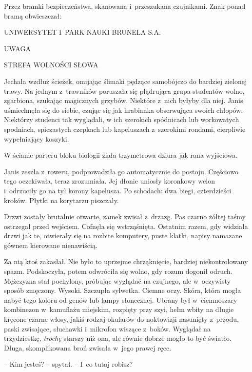 \documentclass[oneside,polish,11pt,sfheadings]{mwbk}
\begin{document}
Przez bramki bezpieczeństwa, skanowana i~przeszukana czujnikami. Znak
ponad bramą obwieszczał:

\begin{center}
UNIWERSYTET I~PARK NAUKI BRUNELA S.A.

UWAGA

STREFA WOLNOŚCI SŁOWA

\end{center}


Jechała wzdłuż ścieżek, omijając ślimaki pędzące samobójczo do bardziej
zielonej trawy. Na jednym z~trawników poruszała się plądrująca grupa
studentów wolno, zgarbiona, szukając magicznych grzybów. Niektóre z~nich
byłyby dla niej. Janis uśmiechnęła się do siebie, czując się jak
hrabianka obserwująca swoich chłopów. Niektórzy studenci tak wyglądali,
w ich szerokich spódnicach lub workowatych spodniach, spiczastych
czepkach lub kapeluszach z~szerokimi rondami, cierpliwie wypełniający
koszyki.

W ścianie parteru bloku biologii ziała trzymetrowa dziura jak rana
wyjściowa.

Janis zeszła z~roweru, podprowadziła go automatycznie do postoju.
Częściowo tego oczekiwała, teraz zrozumiała. Jej dłonie uniosły
koronkowy welon i~odrzuciły go na tył korony kapelusza. Po schodach: dwa
biegi, czterdzieści kroków. Płytki na korytarzu piszczały.

Drzwi zostały brutalnie otwarte, zamek zwisał z~drzazg. Pas czarno żółtej
taśmy ostrzegał przed wejściem. Cofnęła się wstrząśnięta. Ostatnim
razem, gdy widziała drzwi jak te, otwierały się na rozbite komputery,
puste klatki, napisy namazane gównem kierowane nienawiścią.

Za nią ktoś zakasłał. Nie było to uprzejme chrząknięcie, bardziej
niekontrolowany spazm. Podskoczyła, potem odwróciła się wolno, gdy rozum
dogonił odruch. Mężczyzna stał pochylony, próbując wyglądać na czujnego,
ale w~oczywisty sposób zmęczony. Wysoki. Szczupła sylwetka. Ciemne oczy.
Skóra, która mogła nabyć tego koloru od genów lub lampy słonecznej.
Ubrany był w~ciemnoszary kombinezon w~kamuflażu miejskim, rozpięty przy
szyi, hełm wbity na długie kręcone czarne włosy, jakiś rodzaj okularów
do noktowizji nasunięty z~przodu, paski zwisające, słuchawki i~mikrofon
wiszące z~boków. Wyglądał na trzydziestkę, \emph{trochę} starszy niż
ona, ale równie dobrze mogło to być światło. Długa, skomplikowana broń
zwisała w~jego prawej ręce.

-- Kim jesteś? -- spytał. -- I~co tutaj robisz?
\end{document}
